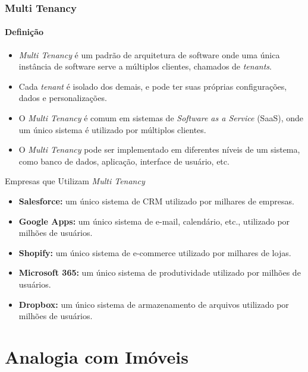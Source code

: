 \documentclass[
	9pt, %
	t, %
]{beamer}
\begin{document}
\begin{frame}
	\frametitle{Multi Tenancy}
	\framesubtitle{Definição}

	\begin{itemize}
		\item \textit{Multi Tenancy} é um padrão de arquitetura de software onde uma única instância de software serve a múltiplos clientes, chamados de \textit{tenants}.
		\item Cada \textit{tenant} é isolado dos demais, e pode ter suas próprias configurações, dados e personalizações.
		\item O \textit{Multi Tenancy} é comum em sistemas de \textit{Software as a Service} (SaaS), onde um único sistema é utilizado por múltiplos clientes.
		\item O \textit{Multi Tenancy} pode ser implementado em diferentes níveis de um sistema, como banco de dados, aplicação, interface de usuário, etc.
	\end{itemize}

	\begin{block}{Empresas que Utilizam \textit{Multi Tenancy}}
		\begin{itemize}
			\item \textbf{Salesforce:} um único sistema de CRM utilizado por milhares de empresas.
			\item \textbf{Google Apps:} um único sistema de e-mail, calendário, etc., utilizado por milhões de usuários.
			\item \textbf{Shopify:} um único sistema de e-commerce utilizado por milhares de lojas.
			\item \textbf{Microsoft 365:} um único sistema de produtividade utilizado por milhões de usuários.
			\item \textbf{Dropbox:} um único sistema de armazenamento de arquivos utilizado por milhões de usuários.
		\end{itemize}
	\end{block}

\end{frame}

\section{Analogia com Imóveis}
\end{document}

